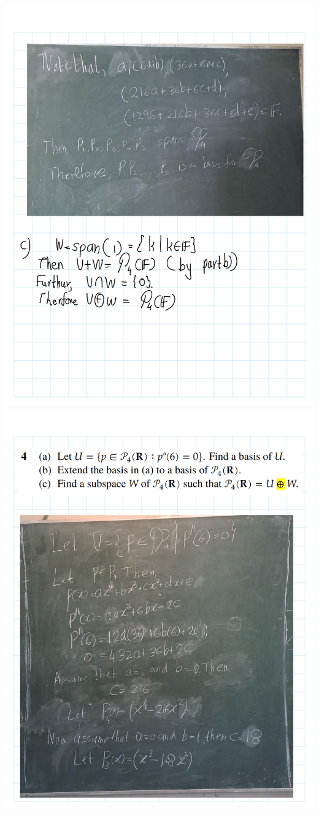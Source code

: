 \documentclass[
]{book}
\theoremstyle{definition}
\theoremstyle{definition}
\theoremstyle{definition}
\theoremstyle{definition}
\theoremstyle{remark}
\begin{document}
\includegraphics{fig/Ex 2B and 2C/Ex 2c (12).png}
\includegraphics{fig/Ex 2B and 2C/Ex 2c (13).png}
\end{document}
